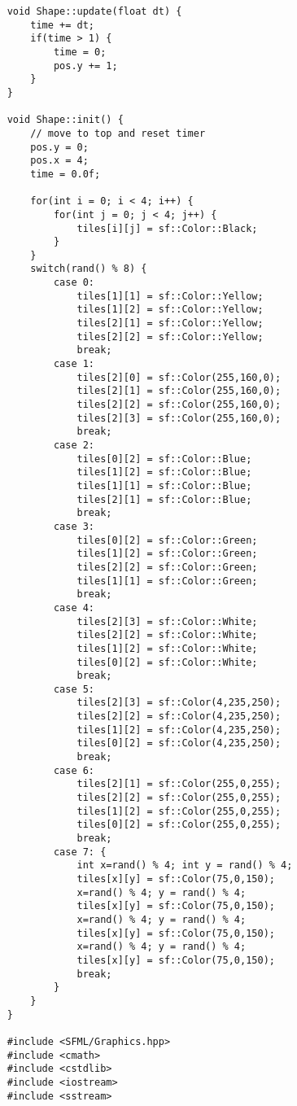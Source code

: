 \documentclass[11pt]{amsart}
\begin{document}
\begin{verbatim}
	void Shape::update(float dt) {
	    time += dt;
	    if(time > 1) {
	        time = 0;
	        pos.y += 1;
	    }
	}

	void Shape::init() {
	    // move to top and reset timer
	    pos.y = 0;
	    pos.x = 4;
	    time = 0.0f;

	    for(int i = 0; i < 4; i++) {
	        for(int j = 0; j < 4; j++) {
	            tiles[i][j] = sf::Color::Black;
	        }
	    }
	    switch(rand() % 8) {
	        case 0:
	            tiles[1][1] = sf::Color::Yellow;
	            tiles[1][2] = sf::Color::Yellow;
	            tiles[2][1] = sf::Color::Yellow;
	            tiles[2][2] = sf::Color::Yellow;
	            break;
	        case 1:
	            tiles[2][0] = sf::Color(255,160,0);
	            tiles[2][1] = sf::Color(255,160,0);
	            tiles[2][2] = sf::Color(255,160,0);
	            tiles[2][3] = sf::Color(255,160,0);
	            break;
	        case 2:
	            tiles[0][2] = sf::Color::Blue;
	            tiles[1][2] = sf::Color::Blue;
	            tiles[1][1] = sf::Color::Blue;
	            tiles[2][1] = sf::Color::Blue;
	            break;
	        case 3:
	            tiles[0][2] = sf::Color::Green;
	            tiles[1][2] = sf::Color::Green;
	            tiles[2][2] = sf::Color::Green;
	            tiles[1][1] = sf::Color::Green;
	            break;
	        case 4:
	            tiles[2][3] = sf::Color::White;
	            tiles[2][2] = sf::Color::White;
	            tiles[1][2] = sf::Color::White;
	            tiles[0][2] = sf::Color::White;
	            break;
	        case 5:
	            tiles[2][3] = sf::Color(4,235,250);
	            tiles[2][2] = sf::Color(4,235,250);
	            tiles[1][2] = sf::Color(4,235,250);
	            tiles[0][2] = sf::Color(4,235,250);
	            break;
	        case 6:
	            tiles[2][1] = sf::Color(255,0,255);
	            tiles[2][2] = sf::Color(255,0,255);
	            tiles[1][2] = sf::Color(255,0,255);
	            tiles[0][2] = sf::Color(255,0,255);
	            break;
	        case 7: {
	            int x=rand() % 4; int y = rand() % 4;
	            tiles[x][y] = sf::Color(75,0,150);
	            x=rand() % 4; y = rand() % 4;
	            tiles[x][y] = sf::Color(75,0,150);
	            x=rand() % 4; y = rand() % 4;
	            tiles[x][y] = sf::Color(75,0,150);
	            x=rand() % 4; y = rand() % 4;
	            tiles[x][y] = sf::Color(75,0,150);
	            break;
	        }
	    }
	}

	#include <SFML/Graphics.hpp>
	#include <cmath>
	#include <cstdlib>
	#include <iostream>
	#include <sstream>


\end{verbatim}
\end{document}
